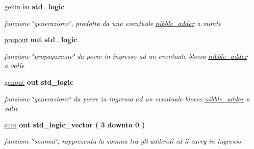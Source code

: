 \begin{DoxyCompactItemize}
\hyperlink{group___nibble_adder_ga0a46d5193cb73eb993bc5d4f69741d0a}{genin}  {\bfseries {\bfseries \textcolor{vhdlchar}{in}\textcolor{vhdlchar}{ }}} {\bfseries \textcolor{vhdlchar}{std\+\_\+logic}\textcolor{vhdlchar}{ }} 
\begin{DoxyCompactList}\small\item\em funzione \char`\"{}generazione\char`\"{}, prodotta da una eventuale \hyperlink{classnibble__adder}{nibble\+\_\+adder} a monte \end{DoxyCompactList}\item 
\hyperlink{group___nibble_adder_ga5957c9cdd706cafd2da8855133a002c9}{propout}  {\bfseries {\bfseries \textcolor{vhdlchar}{out}\textcolor{vhdlchar}{ }}} {\bfseries \textcolor{vhdlchar}{std\+\_\+logic}\textcolor{vhdlchar}{ }} 
\begin{DoxyCompactList}\small\item\em funzione \char`\"{}propagazione\char`\"{} da porre in ingresso ad un eventuale blocco \hyperlink{classnibble__adder}{nibble\+\_\+adder} a valle \end{DoxyCompactList}\item 
\hyperlink{group___nibble_adder_ga068cd5c4d23e284cb942702252ed1491}{genout}  {\bfseries {\bfseries \textcolor{vhdlchar}{out}\textcolor{vhdlchar}{ }}} {\bfseries \textcolor{vhdlchar}{std\+\_\+logic}\textcolor{vhdlchar}{ }} 
\begin{DoxyCompactList}\small\item\em funzione \char`\"{}generazione\char`\"{} da porre in ingresso ad un eventuale blocco \hyperlink{classnibble__adder}{nibble\+\_\+adder} a valle \end{DoxyCompactList}\item 
\hyperlink{group___nibble_adder_gadfe538323c3296159dd3b383325a996b}{sum}  {\bfseries {\bfseries \textcolor{vhdlchar}{out}\textcolor{vhdlchar}{ }}} {\bfseries \textcolor{vhdlchar}{std\+\_\+logic\+\_\+vector}\textcolor{vhdlchar}{ }\textcolor{vhdlchar}{(}\textcolor{vhdlchar}{ }\textcolor{vhdlchar}{ } \textcolor{vhdldigit}{3} \textcolor{vhdlchar}{ }\textcolor{vhdlchar}{downto}\textcolor{vhdlchar}{ }\textcolor{vhdlchar}{ } \textcolor{vhdldigit}{0} \textcolor{vhdlchar}{ }\textcolor{vhdlchar}{)}\textcolor{vhdlchar}{ }} 
\begin{DoxyCompactList}\small\item\em funzione \char`\"{}somma\char`\"{}, rappresenta la somma tra gli addendi ed il carry in ingresso \end{DoxyCompactList}\end{DoxyCompactItemize}


